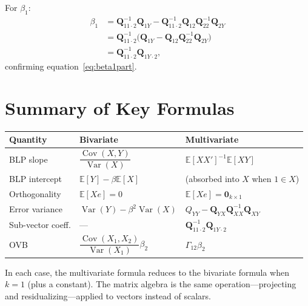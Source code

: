 \documentclass[12pt]{article}
\newcommand{\E}{\mathbb{E}}
\newcommand{\Var}{\operatorname{Var}}
\newcommand{\Cov}{\operatorname{Cov}}
\newcommand{\bfQ}{\mathbf{Q}}
\theoremstyle{definition}
\begin{document}
For $\beta_1$:
\begin{align*}
\beta_1 &= \bfQ_{11\cdot 2}^{-1}\bfQ_{1Y} - \bfQ_{11\cdot 2}^{-1}\bfQ_{12}\bfQ_{22}^{-1}\bfQ_{2Y}\\
&= \bfQ_{11\cdot 2}^{-1}\bigl(\bfQ_{1Y} - \bfQ_{12}\bfQ_{22}^{-1}\bfQ_{2Y}\bigr)\\
&= \bfQ_{11\cdot 2}^{-1}\bfQ_{1Y\cdot 2},
\end{align*}
confirming equation~\eqref{eq:beta1part}.


\section{Summary of Key Formulas}
\label{sec:summary}

\begin{center}
\renewcommand{\arraystretch}{1.8}
\begin{tabular}{p{4cm} l l}
\toprule
\textbf{Quantity} & \textbf{Bivariate} & \textbf{Multivariate} \\
\midrule
BLP slope & $\dfrac{\Cov(X,Y)}{\Var(X)}$ & $\E[XX']^{-1}\E[XY]$ \\[6pt]
BLP intercept & $\E[Y] - \beta\E[X]$ & (absorbed into $X$ when $1 \in X$) \\[6pt]
Orthogonality & $\E[Xe] = 0$ & $\E[Xe] = \mathbf{0}_{k\times 1}$ \\[6pt]
Error variance & $\Var(Y) - \beta^2\Var(X)$ & $Q_{YY} - \bfQ_{YX}\bfQ_{XX}^{-1}\bfQ_{XY}$ \\[6pt]
Sub-vector coeff. & --- & $\bfQ_{11\cdot 2}^{-1}\bfQ_{1Y\cdot 2}$ \\[6pt]
OVB & $\dfrac{\Cov(X_1,X_2)}{\Var(X_1)}\beta_2$ & $\Gamma_{12}\beta_2$ \\
\bottomrule
\end{tabular}
\end{center}

\bigskip
In each case, the multivariate formula reduces to the bivariate formula when $k=1$ (plus a constant). The matrix algebra is the same operation---projecting and residualizing---applied to vectors instead of scalars.
\end{document}
